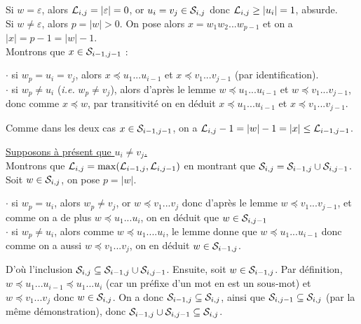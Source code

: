 \begin{Preuve}[la propriété]
\begin{addmargin}{5mm}
	\bdot Si \( w = \varepsilon \), alors \( \cal{L}_{i,j} = |\varepsilon| = 0 \), or \( u_i = v_j \in \cal{S}_{i,j} \) donc \( \cal{L}_{i,j} \geq |u_i| = 1 \), absurde. \\[1mm]
	\bdot Si \( w \neq \varepsilon \), alors \( p = |w| > 0 \). On pose alors \( x = w_1 w_2 ... w_{p-1} \) et on a \( |x| = p - 1 = |w| - 1 \). \\
	Montrons que \( x \in \cal{S}_{i-1,j-1} \) : 
	\begin{addmargin}{5mm}
		\(\cdot\) si \( w_p = u_i = v_j \), alors \( x \preccurlyeq u_1 ... u_{i-1} \) et \( x \preccurlyeq v_1 ... v_{j-1} \) (par identification). \\
		\(\cdot\) si \( w_p \neq u_i \) (\emph{i.e.} \( w_p \neq v_j \)), alors d'après le lemme \( w \preccurlyeq u_1 ... u_{i-1} \) et \( w \preccurlyeq v_1 ... v_{j-1} \), donc comme \( x \preccurlyeq w \), par transitivité on en déduit \( x \preccurlyeq u_1 ... u_{i-1} \) et \( x \preccurlyeq v_1 ... v_{j-1} \). 
	\end{addmargin}
	Comme dans les deux cas \(x\in \cal{S}_{i-1,j-1}\), on a \( \cal{L}_{i,j} - 1 = |w| - 1 = |x| \leq \cal{L}_{i-1,j-1} \).
\end{addmargin}
\underline{\bdot Supposons à présent que \( u_i \neq v_j \).} \\[1mm]
Montrons que \(\cal{L}_{i,j} = \max(\cal{L}_{i-1,j},\cal{L}_{i,j-1})\) en montrant que \(\cal{S}_{i,j} = \cal{S}_{i-1,j} \cup \cal{S}_{i,j-1}\). \nt
Soit \(w\in\cal{S}_{i,j}\), on pose \(p = |w|\). 
\begin{addmargin}{5mm}
	\(\cdot\) si \(w_p = u_i\), alors \(w_p \neq v_j\), or \(w \preccurlyeq v_1...v_j\) donc d'après le lemme \(w \preccurlyeq v_1...v_{j-1}\), et comme on a de plus \(w \preccurlyeq u_1...u_i\), on en déduit que \(w\in\cal{S}_{i,j-1}\) \\
	\(\cdot\) si \(w_p \neq u_i\), alors comme \(w \preccurlyeq u_1....u_i\), le lemme donne que \(w \preccurlyeq u_1...u_{i-1}\) donc comme on a aussi \(w \preccurlyeq v_1...v_j\), on en déduit \(w\in\cal{S}_{i-1,j}\).
\end{addmargin} 
D'où l'inclusion \(\cal{S}_{i,j} \subseteq \cal{S}_{i-1,j} \cup \cal{S}_{i,j-1}\). \nt
Ensuite, soit \(w\in \cal{S}_{i-1,j}\). Par définition, \(w\preccurlyeq u_1...u_{i-1} \preccurlyeq u_1...u_{i} \) (car un préfixe d'un mot en est un sous-mot) et \(w \preccurlyeq v_1...v_j\) donc \(w\in \cal{S}_{i,j}\). On a donc \(\cal{S}_{i-1,j} \subseteq \cal{S}_{i,j}\), ainsi que \(\cal{S}_{i,j-1} \subseteq \cal{S}_{i,j}\) (par la même démonstration), donc \(\cal{S}_{i-1,j} \cup \cal{S}_{i,j-1} \subseteq \cal{S}_{i,j}\). \nt

\end{Preuve}
